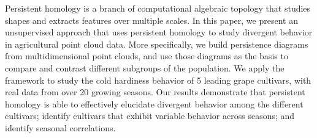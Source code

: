 Persistent homology is a branch of computational algebraic topology that studies shapes and extracts features over multiple scales. In this paper, we present an unsupervised approach that uses persistent homology to study divergent behavior in agricultural point cloud data. More specifically, we build persistence diagrams from multidimensional point clouds, and use those diagrams as the basis to compare and contrast different subgroups of the population. We apply the framework to study the cold hardiness behavior of 5 leading grape cultivars, with real data from over 20 growing seasons. Our results demonstrate that persistent homology is able to effectively elucidate divergent behavior among the different cultivars; identify cultivars that exhibit variable behavior across seasons; and identify seasonal correlations.


